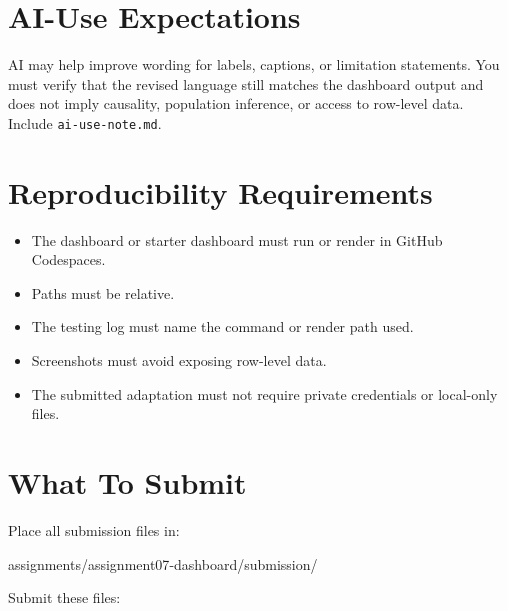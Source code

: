 \documentclass[
  letterpaper,
  DIV=11,
  numbers=noendperiod,
  oneside]{scrreprt}
\newenvironment{Shaded}{\begin{snugshade}}{\end{snugshade}}
\newcommand{\NormalTok}[1]{\textcolor[rgb]{0.00,0.23,0.31}{#1}}
\providecommand{\tightlist}{%
  \setlength{\itemsep}{0pt}\setlength{\parskip}{0pt}}
\begin{document}
\section{AI-Use Expectations}\label{ai-use-expectations-6}

AI may help improve wording for labels, captions, or limitation
statements. You must verify that the revised language still matches the
dashboard output and does not imply causality, population inference, or
access to row-level data. Include \texttt{ai-use-note.md}.

\section{Reproducibility
Requirements}\label{reproducibility-requirements-6}

\begin{itemize}
\tightlist
\item
  The dashboard or starter dashboard must run or render in GitHub
  Codespaces.
\item
  Paths must be relative.
\item
  The testing log must name the command or render path used.
\item
  Screenshots must avoid exposing row-level data.
\item
  The submitted adaptation must not require private credentials or
  local-only files.
\end{itemize}

\section{What To Submit}\label{what-to-submit-6}

Place all submission files in:

\begin{Shaded}
\begin{Highlighting}[numbers=left,,]
\NormalTok{assignments/assignment07{-}dashboard/submission/}
\end{Highlighting}
\end{Shaded}

Submit these files:
\end{document}
